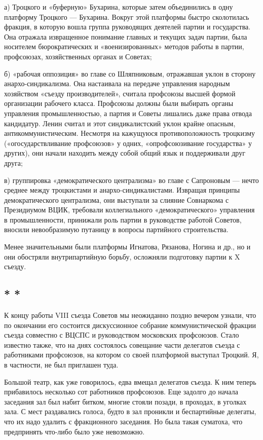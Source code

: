 \documentclass[12pt, a4paper, openany]{book}
\begin{document}
а) Троцкого и «буферную» Бухарина, которые затем объединились в одну платформу Троцкого — Бухарина. Вокруг этой платформы быстро сколотилась фракция, в которую вошла группа руководящих деятелей партии и государства. Она отражала извращенное понимание главных и текущих задач партии, была носителем бюрократических и «военизированных» методов работы в партии, профсоюзах, хозяйственных органах и Советах;

б) «рабочая оппозиция» во главе со Шляпниковым, отражавшая уклон в сторону анархо-синдикализма. Она настаивала на передаче управления народным хозяйством «съезду производителей», считала профсоюзы высшей формой организации рабочего класса. Профсоюзы должны были выбирать органы управления промышленностью, а партия и Советы лишались даже права отвода кандидатур. Ленин считал и этот синдикалистский уклон крайне опасным, антикоммунистическим. Несмотря на кажущуюся противоположность троцкизму («огосударствливание профсоюзов» у одних, «опрофсоюзивание государства» у других), они начали находить между собой общий язык и поддерживали друг друга;

в) группировка «демократического централизма» во главе с Сапроновым — нечто среднее между троцкистами и анархо-синдикалистами. Извращая принципы демократического централизма, они выступали за слияние Совнаркома с Президиумом ВЦИК, требовали коллегиального «демократического» управления в промышленности, принижали роль партии в руководстве работой Советов, вносили невообразимую путаницу в вопросы партийного строительства.

Менее значительными были платформы Игнатова, Рязанова, Ногина и др., но и они обостряли внутрипартийную борьбу, осложняли подготовку партии к X съезду.

\subsection*{\center * * *}

К концу работы VIII съезда Советов мы неожиданно поздно вечером узнали, что по окончании его состоится дискуссионное собрание коммунистической фракции съезда совместно с ВЦСПС и руководством московских профсоюзов. Стало известно также, что на днях состоялось совещание части делегатов съезда с работниками профсоюзов, на котором со своей платформой выступал Троцкий. Я, в частности, не был приглашен туда.

Большой театр, как уже говорилось, едва вмещал делегатов съезда. К ним теперь прибавилось несколько сот работников профсоюзов. Еще задолго до начала заседания зал был набит битком, многие стояли позади, в проходах, в уголках зала. С мест раздавались голоса, будто в зал проникли и беспартийные делегаты, что их надо удалить с фракционного заседания. Но была такая суматоха, что предпринять что-либо было уже невозможно.
\end{document}
